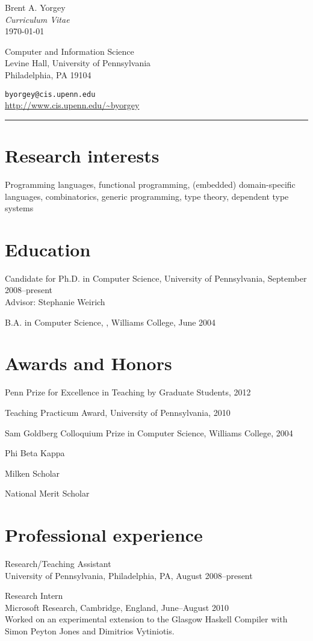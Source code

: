 \documentclass{article}
\newcommand{\cvitem}{\par\hangpara{2em}{1}}
\begin{document}
\begin{center}
  {\huge Brent A. Yorgey} \\
  \emph{Curriculum Vitae} \\
  \today
\end{center}

\noindent
\parbox{2.5in}{
Computer and Information Science \\
Levine Hall, University of Pennsylvania \\
Philadelphia, PA 19104
}
\hfill
\parbox{2.5in}{
\texttt{byorgey@cis.upenn.edu} \\
\url{http://www.cis.upenn.edu/~byorgey}
}
\medskip

\hrule

\section*{Research interests}
Programming languages, functional programming, (embedded)
domain-specific languages, combinatorics, generic programming, type
theory, dependent type systems

\section*{Education}
\cvitem
Candidate for Ph.D. in Computer Science, University of Pennsylvania,
September 2008--present \\
Advisor: Stephanie Weirich

\cvitem B.A. in Computer Science, , Williams
College, June 2004

\section*{Awards and Honors}
\cvitem Penn Prize for Excellence in Teaching by Graduate Students, 2012
\cvitem Teaching Practicum Award, University of Pennsylvania, 2010
\cvitem Sam Goldberg Colloquium Prize in Computer Science, Williams
College, 2004
\cvitem Phi Beta Kappa
\cvitem Milken Scholar
\cvitem National Merit Scholar

\section*{Professional experience}
\cvitem
Research/Teaching Assistant \\
University of Pennsylvania, Philadelphia, PA, August 2008--present

\cvitem
Research Intern \\
Microsoft Research, Cambridge, England, June--August 2010 \\
Worked on an experimental extension to the Glasgow Haskell Compiler with
Simon Peyton Jones and Dimitrios Vytiniotis.
\end{document}

